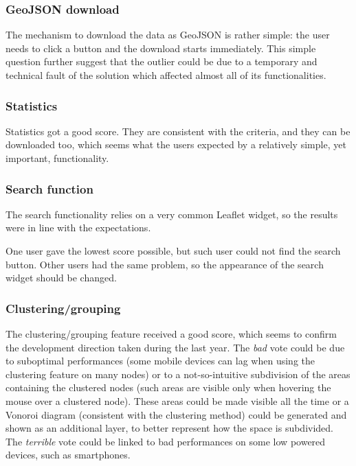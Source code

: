 \documentclass{Configuration_Files/PoliMi3i_thesis}
\begin{document}
\subsubsection{GeoJSON download}

The mechanism to download the data as GeoJSON is rather simple: the user needs to click a button and the download starts immediately. This simple question further suggest that the outlier could be due to a temporary and technical fault of the solution which affected almost all of its functionalities.

\subsubsection{Statistics}

Statistics got a good score. They are consistent with the criteria, and they can be downloaded too, which seems what the users expected by a relatively simple, yet important, functionality.

\subsubsection{Search function}

The search functionality relies on a very common Leaflet widget, so the results were in line with the expectations.

One user gave the lowest score possible, but such user could not find the search button. Other users had the same problem, so the appearance of the search widget should be changed.

\subsubsection{Clustering/grouping}

The clustering/grouping feature received a good score, which seems to confirm the development direction taken during the last year. The \textit{bad} vote could be due to suboptimal performances (some mobile devices can lag when using the clustering feature on many nodes) or to a not-so-intuitive subdivision of the areas containing the clustered nodes (such areas are visible only when hovering the mouse over a clustered node). These areas could be made visible all the time or a Vonoroi diagram (consistent with the clustering method) could be generated and shown as an additional layer, to better represent how the space is subdivided. The \textit{terrible} vote could be linked to bad performances on some low powered devices, such as smartphones.
\end{document}

